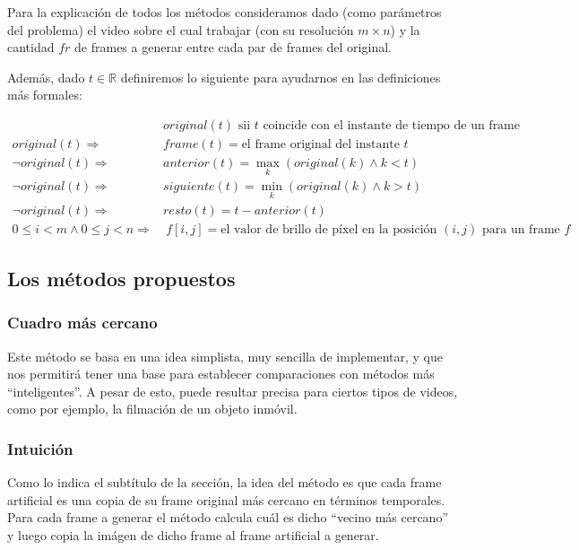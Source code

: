 Para la explicación de todos los métodos consideramos dado (como parámetros del problema) el video sobre el cual trabajar (con su resolución $m \times n$) y la cantidad $fr$ de frames a generar entre cada par de frames del original.

Además, dado $t \in \mathbb{R}$ definiremos lo siguiente para ayudarnos en las definiciones más formales:

\begin{align*}
    &original(t) \text{ sii } t \text{ coincide con el instante de tiempo de un frame original}\\
    original(t) \Rightarrow\ &frame(t)=\text{el frame original del instante $t$}\\
    \neg original(t) \Rightarrow\ &anterior(t) = \max_{k}(original(k) \wedge k < t)\\
    \neg original(t) \Rightarrow\ &siguiente(t) = \min_{k}(original(k) \wedge k > t)\\
    \neg original(t) \Rightarrow\ &resto(t) = t-anterior(t)\\
    0 \leq i < m \wedge 0 \leq j < n \Rightarrow&\ f[i,j] =\text{el valor de brillo de píxel en la posición $(i, j)$ para un frame $f$}
\end{align*}


\subsection{Los m\'etodos propuestos}
\subsubsection{Cuadro m\'as cercano}

Este m\'etodo se basa en una idea simplista, muy sencilla de implementar, y que nos permitirá tener una base para establecer comparaciones con métodos más ``inteligentes''. A pesar de esto, puede resultar precisa para ciertos tipos de videos, como por ejemplo, la filmaci\'on de un objeto inmóvil.

\subsubsection*{\bf{Intuición}}

Como lo indica el subt\'itulo de la secci\'on, la idea del método es que cada frame artificial es una copia de su frame original más cercano en términos temporales. Para cada frame a generar el método calcula cuál es dicho ``vecino más cercano'' y luego copia la im\'agen de dicho frame al frame artificial a generar. 

